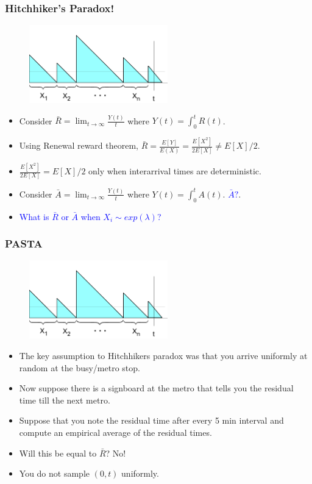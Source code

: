 \documentclass{beamer}
\def \mp {\pause}
\def \mp {}
\newcommand{\ft}[1]{\frametitle{#1}}
\newcommand{\tcb}[1]{\textcolor{blue}{#1}}
\begin{document}
\begin{frame}
 \ft{Hitchhiker's Paradox!}
 \begin{figure}
\includegraphics[width=6cm]{hitch}
\centering
\end{figure}
\begin{itemize}\setlength\itemsep{.8em}
\mp \item Consider $\bar{R} = \lim_{t \rightarrow \infty} \frac{Y(t)}{t}$ where $Y(t) = \int_0^t R(t)$.
 \mp \item Using Renewal reward theorem, $\bar{R} = \frac{E[Y]}{E(X)} = \frac{E[X^2]}{2E[X]} \neq E[X]/2.$
 \mp \item $\frac{E[X^2]}{2E[X]} = E[X]/2$ only when interarrival times are deterministic.
 
 \mp \item Consider $\bar{A} = \lim_{t \rightarrow \infty} \frac{Y(t)}{t}$ where $Y(t) = \int_0^t A(t)$. \mp \tcb{$\bar{A}?$}.
 
 \mp \item \tcb{What is $\bar{R}$ or $\bar{A}$ when $X_i \sim exp(\lambda)$?}
 
 
 \end{itemize}
\end{frame}

\begin{frame}
\ft{PASTA} 
 \begin{figure}
\includegraphics[width=6cm]{hitch}
\centering
\end{figure}
\begin{itemize}\setlength\itemsep{.4em}
 \mp \item The key assumption to Hitchhikers paradox was that you arrive uniformly at random at the busy/metro stop.
 \mp \item Now suppose there is a signboard at the metro that tells you the residual time till the next metro. 
 
 \mp \item Suppose that you note the residual time after every 5 min interval and compute an empirical average of the residual times.
 \mp \item Will this be equal to $\bar{R}$? \mp No! 
 \mp\item You do not sample $(0,t)$ uniformly.
\end{itemize}
\end{frame}
\end{document}
